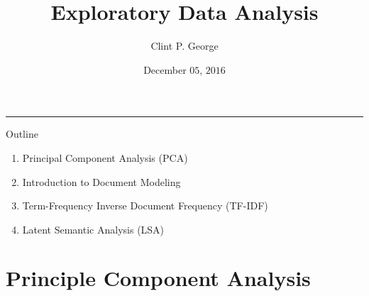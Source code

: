 \documentclass[compress,mathserif,t]{beamer} %
\title{Exploratory Data Analysis}
\author{Clint P. George}
\institute[UFII]{ University of Florida Informatics Institute\\ 
\vspace{10mm}
}
\date{\small{December $05$, $2016$}}
\begin{document}
\maketitle



\begin{frame}

\color{blue}\rule{\linewidth}{4pt}
Outline
\begin{enumerate}
	\item Principal Component Analysis (PCA)
	\item Introduction to Document Modeling 
	\item Term-Frequency Inverse Document Frequency (TF-IDF)
	\item Latent Semantic Analysis (LSA)
\end{enumerate}




\end{frame}


\section{Principle Component Analysis}
\end{document}
